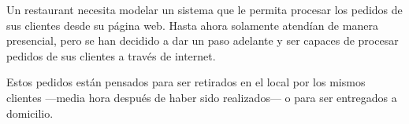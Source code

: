 \documentclass[11pt,letterpaper]{article}
\begin{document}
\begin{spacing}{1.2}
\thispagestyle{empty}
\evaluationTitle

\newcommand{\separatorLine}{\begin{center}\rule{.6\textwidth}{1pt}\end{center}}

\begin{Problem}

     Un restaurant necesita modelar un sistema que le permita procesar
    los pedidos de sus clientes desde su página web. Hasta ahora solamente atendían de manera presencial, pero se
    han decidido a dar un paso adelante y ser capaces de procesar pedidos de sus clientes a través
    de internet.
    
    Estos pedidos
    están pensados para ser retirados en el local por los mismos clientes ---media hora después de haber sido
    realizados--- o para ser entregados a domicilio.


\end{Problem}
\end{spacing}
\end{document}
